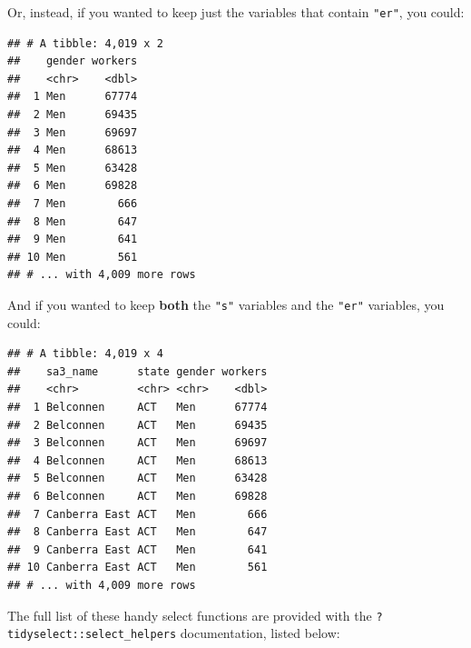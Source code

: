 \documentclass[]{book}
\newenvironment{Shaded}{\begin{snugshade}}{\end{snugshade}}
\newcommand{\KeywordTok}[1]{\textcolor[rgb]{0.13,0.29,0.53}{\textbf{#1}}}
\newcommand{\NormalTok}[1]{#1}
\newcommand{\OperatorTok}[1]{\textcolor[rgb]{0.81,0.36,0.00}{\textbf{#1}}}
\newcommand{\StringTok}[1]{\textcolor[rgb]{0.31,0.60,0.02}{#1}}
\begin{document}
Or, instead, if you wanted to keep just the variables that contain \texttt{"er"}, you could:

\begin{Shaded}
\end{Shaded}

\begin{verbatim}
## # A tibble: 4,019 x 2
##    gender workers
##    <chr>    <dbl>
##  1 Men      67774
##  2 Men      69435
##  3 Men      69697
##  4 Men      68613
##  5 Men      63428
##  6 Men      69828
##  7 Men        666
##  8 Men        647
##  9 Men        641
## 10 Men        561
## # ... with 4,009 more rows
\end{verbatim}

And if you wanted to keep \textbf{both} the \texttt{"s"} variables and the \texttt{"er"} variables, you could:

\begin{Shaded}
\end{Shaded}

\begin{verbatim}
## # A tibble: 4,019 x 4
##    sa3_name      state gender workers
##    <chr>         <chr> <chr>    <dbl>
##  1 Belconnen     ACT   Men      67774
##  2 Belconnen     ACT   Men      69435
##  3 Belconnen     ACT   Men      69697
##  4 Belconnen     ACT   Men      68613
##  5 Belconnen     ACT   Men      63428
##  6 Belconnen     ACT   Men      69828
##  7 Canberra East ACT   Men        666
##  8 Canberra East ACT   Men        647
##  9 Canberra East ACT   Men        641
## 10 Canberra East ACT   Men        561
## # ... with 4,009 more rows
\end{verbatim}

The full list of these handy select functions are provided with the \texttt{?tidyselect::select\_helpers} documentation, listed below:
\end{document}
